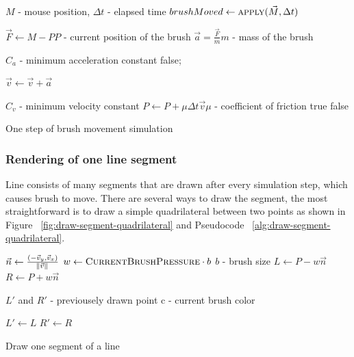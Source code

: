\begin{pseudocode}
  \begin{algorithmic}

  	 \Comment $M$ - mouse position, $\Delta t$ - elapsed time
	      \State $brushMoved \gets \Call{apply}{\vec{M}, \Delta t} $
              \State {}
          \EndIf
      \EndIf
 	\EndFunction

      \State $ \vec{F} \gets M - P $\Comment $P$ - current position of the brush
      \State $ \vec{a} = \frac{\vec{F}}{m} $\Comment $m$ - mass of the brush

       \Comment $C_a$ - minimum acceleration constant
	      \State \Return false;    
       \EndIf
      
      \State $\vec{v} \gets \vec{v} + \vec{a}$

       \Comment $C_v$ - minimum velocity constant
          \State $ P \gets P + \mu\Delta t\vec{v} $\Comment $\mu$ - coefficient of friction
		  \State \Return true
      \EndIf
      \State \Return false
  	\EndFunction
  \end{algorithmic}
\caption{One step of brush movement simulation}
\label{alg:one-step}
\end{pseudocode}

\subsubsection*{Rendering of one line segment}

Line consists of many segments that are drawn after every simulation step, which causes brush to move. There are several ways to draw the segment, the most straightforward is to draw a simple quadrilateral between two points as shown in Figure ~\ref{fig:draw-segment-quadrilateral} and Pseudocode ~\ref{alg:draw-segment-quadrilateral}.

\begin{pseudocode}
	\begin{algorithmic}
              \State $ \vec{n} \gets \frac{(-\vec{v}_y, \vec{v}_x)}{\norm{\vec{v}}} $        
              \State $ w \gets \Call{CurrentBrushPressure}{} \cdot b $ \Comment $b$ - brush size
              \State $L \gets P - w\vec{n}$
              \State $R \gets P + w\vec{n}$

              \State {}
              \State {} \Comment $L'$ and $R'$ - previousely drawn point
              \State {}
              \State {}
              \State {}
              \State {}
              \State {} \Comment c - current brush color

              \State $L' \gets L$
              \State $R' \gets R$
          \EndFunction
       \end{algorithmic}
  	   \caption{Draw one segment of a line}
      \label{alg:draw-segment-quadrilateral}
   \end{pseudocode}

